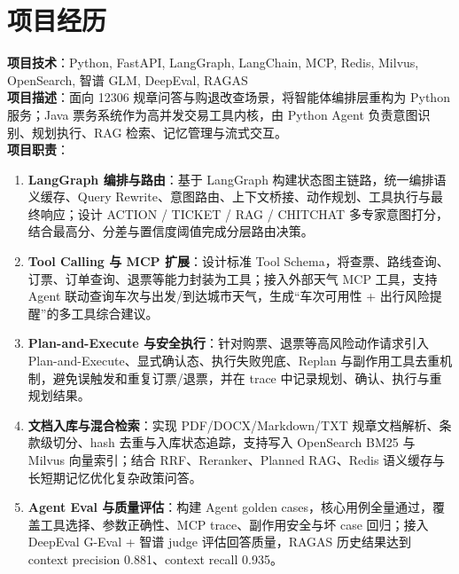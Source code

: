 \documentclass{resume}
\begin{document}
\section{项目经历}

\textbf{项目技术}：Python, FastAPI, LangGraph, LangChain, MCP, Redis, Milvus, OpenSearch, 智谱 GLM, DeepEval, RAGAS\\
\textbf{项目描述}：面向 12306 规章问答与购退改查场景，将智能体编排层重构为 Python 服务；Java 票务系统作为高并发交易工具内核，由 Python Agent 负责意图识别、规划执行、RAG 检索、记忆管理与流式交互。\\
\textbf{项目职责}：
\begin{enumerate}[parsep=0.5ex]
    \item \textbf{LangGraph 编排与路由}：基于 LangGraph 构建状态图主链路，统一编排语义缓存、Query Rewrite、意图路由、上下文桥接、动作规划、工具执行与最终响应；设计 ACTION / TICKET / RAG / CHITCHAT 多专家意图打分，结合最高分、分差与置信度阈值完成分层路由决策。
    \item \textbf{Tool Calling 与 MCP 扩展}：设计标准 Tool Schema，将查票、路线查询、订票、订单查询、退票等能力封装为工具；接入外部天气 MCP 工具，支持 Agent 联动查询车次与出发/到达城市天气，生成“车次可用性 + 出行风险提醒”的多工具综合建议。
    \item \textbf{Plan-and-Execute 与安全执行}：针对购票、退票等高风险动作请求引入 Plan-and-Execute、显式确认态、执行失败兜底、Replan 与副作用工具去重机制，避免误触发和重复订票/退票，并在 trace 中记录规划、确认、执行与重规划结果。
    \item \textbf{文档入库与混合检索}：实现 PDF/DOCX/Markdown/TXT 规章文档解析、条款级切分、hash 去重与入库状态追踪，支持写入 OpenSearch BM25 与 Milvus 向量索引；结合 RRF、Reranker、Planned RAG、Redis 语义缓存与长短期记忆优化复杂政策问答。
    \item \textbf{Agent Eval 与质量评估}：构建 Agent golden cases，核心用例全量通过，覆盖工具选择、参数正确性、MCP trace、副作用安全与坏 case 回归；接入 DeepEval G-Eval + 智谱 judge 评估回答质量，RAGAS 历史结果达到 context precision 0.881、context recall 0.935。
\end{enumerate}
\end{document}
